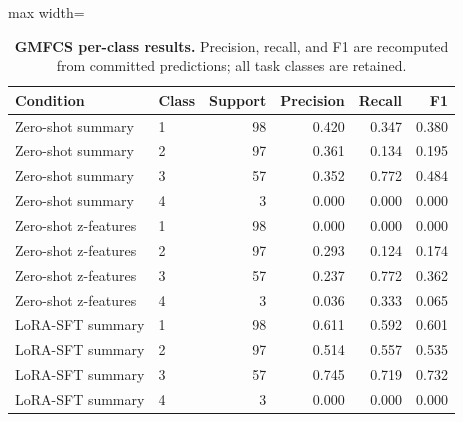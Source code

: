 \begin{table}[H]
\centering
\caption{\textbf{GMFCS per-class results.} Precision, recall, and F1 are recomputed from committed predictions; all task classes are retained.}
\label{tab:per_class_gmfcs}
\small
\begin{adjustbox}{max width=\textwidth}
\begin{tabular}{llrrrr}
\toprule
Condition & Class & Support & Precision & Recall & F1 \\
\midrule
Zero-shot summary & 1 & 98 & 0.420 & 0.347 & 0.380 \\
Zero-shot summary & 2 & 97 & 0.361 & 0.134 & 0.195 \\
Zero-shot summary & 3 & 57 & 0.352 & 0.772 & 0.484 \\
Zero-shot summary & 4 & 3 & 0.000 & 0.000 & 0.000 \\
Zero-shot z-features & 1 & 98 & 0.000 & 0.000 & 0.000 \\
Zero-shot z-features & 2 & 97 & 0.293 & 0.124 & 0.174 \\
Zero-shot z-features & 3 & 57 & 0.237 & 0.772 & 0.362 \\
Zero-shot z-features & 4 & 3 & 0.036 & 0.333 & 0.065 \\
LoRA-SFT summary & 1 & 98 & 0.611 & 0.592 & 0.601 \\
LoRA-SFT summary & 2 & 97 & 0.514 & 0.557 & 0.535 \\
LoRA-SFT summary & 3 & 57 & 0.745 & 0.719 & 0.732 \\
LoRA-SFT summary & 4 & 3 & 0.000 & 0.000 & 0.000 \\
\bottomrule
\end{tabular}
\end{adjustbox}
\end{table}
